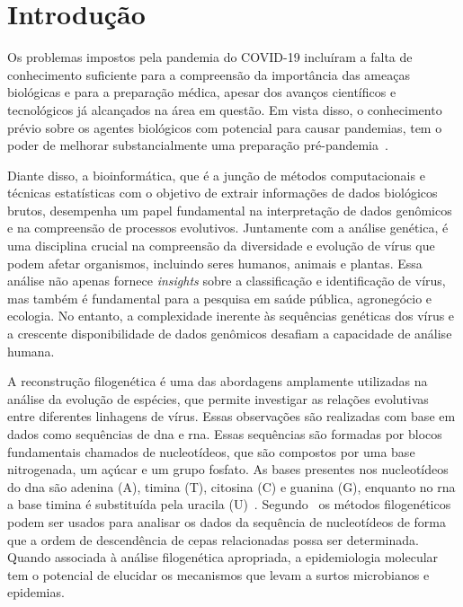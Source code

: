 
\chapter{Introdução}

\setlength{\parskip}{0.3cm}

Os problemas impostos pela pandemia do COVID-19 incluíram a falta de conhecimento suficiente para a compreensão da importância das ameaças biológicas e para a preparação médica, apesar dos avanços científicos e tecnológicos já alcançados na área em questão. Em vista disso, o conhecimento prévio sobre os agentes biológicos com potencial para causar pandemias, tem o poder de melhorar substancialmente uma preparação pré-pandemia~\cite{behl_threat_2022}.

Diante disso, a bioinformática, que é a junção de métodos computacionais e técnicas estatísticas com o objetivo de extrair informações de dados biológicos brutos, desempenha um papel fundamental na interpretação de dados genômicos e na compreensão de processos evolutivos. Juntamente com a análise genética, é uma disciplina crucial na compreensão da diversidade e evolução de vírus que podem afetar organismos, incluindo seres humanos, animais e plantas. Essa análise não apenas fornece \textit{insights} sobre a classificação e identificação de vírus, mas também é fundamental para a pesquisa em saúde pública, agronegócio e ecologia. No entanto, a complexidade inerente às sequências genéticas dos vírus e a crescente disponibilidade de dados genômicos desafiam a capacidade de análise humana.

A reconstrução filogenética é uma das abordagens amplamente utilizadas na análise da evolução de espécies, que permite investigar as relações evolutivas entre diferentes linhagens de vírus. Essas observações são realizadas com base em dados como sequências de \gls{dna} e \gls{rna}. Essas sequências são formadas por blocos fundamentais chamados de nucleotídeos, que são compostos por uma base nitrogenada, um açúcar e um grupo fosfato. As bases presentes nos nucleotídeos do \gls{dna} são adenina (A), timina (T), citosina (C) e guanina (G), enquanto no \gls{rna} a base timina é substituída pela uracila (U)~\cite{alberts_molecular_2002}.
Segundo~\citeauthor{barry_phylogenetic_analysis_2006} os métodos filogenéticos podem ser usados para analisar os dados da sequência de nucleotídeos de forma que a ordem de descendência de cepas relacionadas possa ser determinada. Quando associada à análise filogenética apropriada, a epidemiologia molecular tem o potencial de elucidar os mecanismos que levam a surtos microbianos e epidemias.

